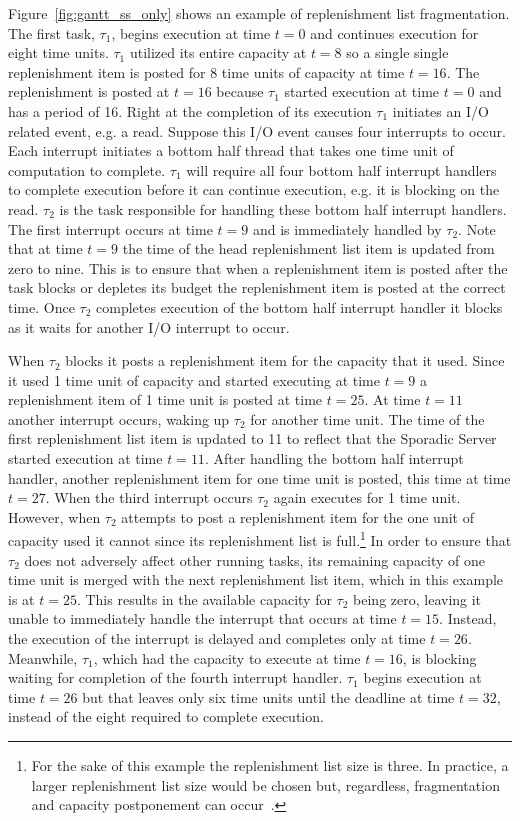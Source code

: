 Figure~\ref{fig:gantt_ss_only} shows an example of replenishment list
fragmentation.  The first task, $\tau_1$, begins execution at time $t{=}0$ and
continues execution for eight time units.  $\tau_1$ utilized its entire
capacity at $t{=}8$ so a single single replenishment item is posted for 8 time
units of capacity at time $t{=}16$.  The replenishment is posted at $t{=}16$
because $\tau_1$ started execution at time $t{=}0$ and has a period of 16.
Right at the completion of its execution $\tau_1$ initiates an I/O related
event, e.g. a read.  Suppose this I/O event causes four interrupts to
occur.  Each interrupt initiates a bottom half thread that takes one time unit
of computation to complete.  $\tau_1$ will require all four bottom half
interrupt handlers to complete execution before it can continue execution,
e.g. it is blocking on the read.  $\tau_2$ is the task responsible for
handling these bottom half interrupt handlers.  The first interrupt occurs at
time $t{=}9$ and is immediately handled by $\tau_2$.  Note that at time
$t{=}9$ the time of the head replenishment list item is updated from zero to
nine.  This is to ensure that when a replenishment item is posted after the
task blocks or depletes its budget the replenishment item is posted at the
correct time.  Once $\tau_2$ completes execution of the bottom half interrupt
handler it blocks as it waits for another I/O interrupt to occur.

When $\tau_2$ blocks it posts a replenishment item for the capacity that it
used.  Since it used 1 time unit of capacity and started executing at time
$t{=}9$ a replenishment item of 1 time unit is posted at time $t{=}25$.  At
time $t=11$ another interrupt occurs, waking up $\tau_2$ for another time
unit.  The time of the first replenishment list item is updated to 11 to
reflect that the Sporadic Server started execution at time $t{=}11$.  After
handling the bottom half interrupt handler, another replenishment item for one
time unit is posted, this time at time $t{=}27$.  When the third interrupt
occurs $\tau_2$ again executes for 1 time unit.  However, when $\tau_2$
attempts to post a replenishment item for the one unit of capacity used it
cannot since its replenishment list is full.\footnote{For the sake of this
example the replenishment list size is three.  In practice, a larger
replenishment list size would be chosen but, regardless, fragmentation and
capacity postponement can occur~\cite{DanishLiWe11}.}  In order to ensure that
$\tau_2$ does not adversely affect other running tasks, its remaining capacity
of one time unit is merged with the next replenishment list item, which in
this example is at $t{=}25$.  This results in the available capacity for
$\tau_2$ being zero, leaving it unable to immediately handle the interrupt
that occurs at time $t{=}15$.  Instead, the execution of the interrupt is
delayed and completes only at time $t{=}26$.  Meanwhile, $\tau_1$, which had
the capacity to execute at time $t{=}16$, is blocking waiting for completion of
the fourth interrupt handler.  $\tau_1$ begins execution at time $t{=}26$ but
that leaves only six time units until the deadline at time $t{=}32$, instead
of the eight required to complete execution.

